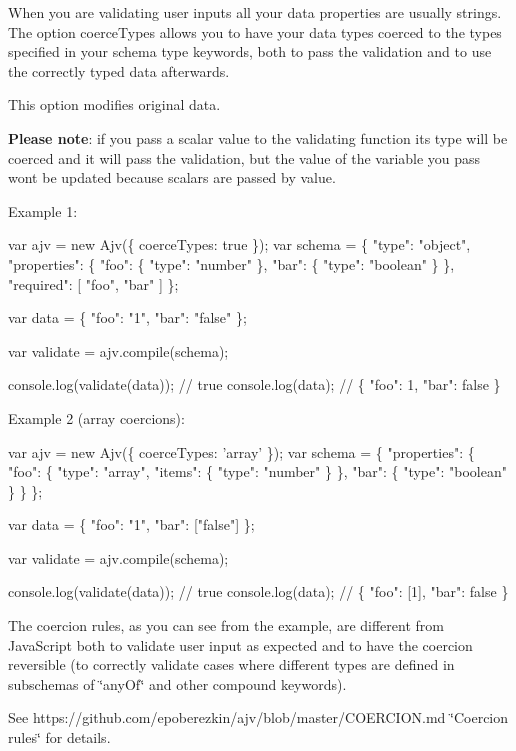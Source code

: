 When you are validating user inputs all your data properties are usually strings. The option {\ttfamily coerce\+Types} allows you to have your data types coerced to the types specified in your schema {\ttfamily type} keywords, both to pass the validation and to use the correctly typed data afterwards.

This option modifies original data.

{\bfseries Please note}\+: if you pass a scalar value to the validating function its type will be coerced and it will pass the validation, but the value of the variable you pass won\textquotesingle{}t be updated because scalars are passed by value.

Example 1\+:


\begin{DoxyCode}
var ajv = new Ajv(\{ coerceTypes: true \});
var schema = \{
  "type": "object",
  "properties": \{
    "foo": \{ "type": "number" \},
    "bar": \{ "type": "boolean" \}
  \},
  "required": [ "foo", "bar" ]
\};

var data = \{ "foo": "1", "bar": "false" \};

var validate = ajv.compile(schema);

console.log(validate(data)); // true
console.log(data); // \{ "foo": 1, "bar": false \}
\end{DoxyCode}


Example 2 (array coercions)\+:


\begin{DoxyCode}
var ajv = new Ajv(\{ coerceTypes: 'array' \});
var schema = \{
  "properties": \{
    "foo": \{ "type": "array", "items": \{ "type": "number" \} \},
    "bar": \{ "type": "boolean" \}
  \}
\};

var data = \{ "foo": "1", "bar": ["false"] \};

var validate = ajv.compile(schema);

console.log(validate(data)); // true
console.log(data); // \{ "foo": [1], "bar": false \}
\end{DoxyCode}


The coercion rules, as you can see from the example, are different from Java\+Script both to validate user input as expected and to have the coercion reversible (to correctly validate cases where different types are defined in subschemas of \char`\"{}any\+Of\char`\"{} and other compound keywords).

See https\+://github.com/epoberezkin/ajv/blob/master/\+C\+O\+E\+R\+C\+I\+O\+N.\+md \char`\"{}\+Coercion rules\char`\"{} for details.

